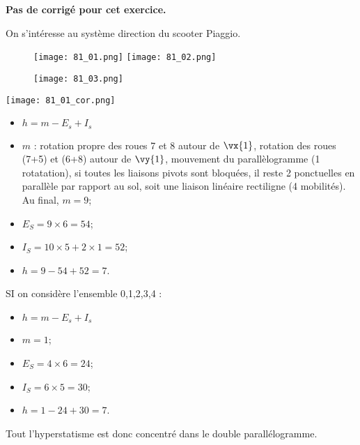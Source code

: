\normaltrue \difficilefalse \tdifficilefalse
\correctionfalse

\setcounter{question}{0}


\ifcorrection
\else
\textbf{Pas de corrigé pour cet exercice.}
\fi


\ifprof
\else
On s'intéresse au système direction du scooter Piaggio.

\begin{figure}[H]
\centering
\texttt{[image: 81\_01.png]}
\texttt{[image: 81\_02.png]}
\end{figure} 



\begin{figure}[H]
\centering
\texttt{[image: 81\_03.png]}
\end{figure} 
\fi

\ifprof
\begin{center}
\texttt{[image: 81\_01\_cor.png]}
\end{center}
\else
\fi

\ifprof
\begin{itemize}
\item $h = m -E_s + I_s$ 
\item $m$ : rotation propre des roues 7 et 8 autour de $\vx{1}$, rotation des roues (7+5) et (6+8) autour de $\vy{1}$,  mouvement du parallèlogramme (1 rotatation), si toutes les liaisons pivots sont bloquées, il reste 2 ponctuelles en parallèle par rapport au sol, soit une liaison linéaire rectiligne (4 mobilités). Au final, $m=9$;
\item $E_S =9\times 6 = 54$;
\item $I_S = 10\times 5 + 2 \times 1 = 52$;
\item $h = 9 -54 + 52 = 7$.
\end{itemize}
\else
\fi
{}
\ifprof
SI on considère l'ensemble 0,1,2,3,4 : 
\begin{itemize}
\item $h = m -E_s + I_s$ 
\item $m = 1$; 
\item $E_S =4\times 6 = 24$;
\item $I_S = 6\times 5  = 30$;
\item $h = 1 -24 + 30 = 7$. 
\end{itemize}
Tout l'hyperstatisme est donc concentré dans le double parallélogramme. 

